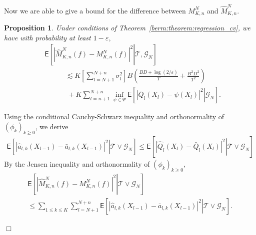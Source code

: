 \documentclass[bj]{imsart}
\def\NtrainPath{T}
\def\TrainSet{\mathcal{T}}
\newcommand{\proofendsign}{$\Box$}
\newtheorem{prop}[thm]{Proposition}
\newenvironment{proof}{{\noindent \bf Proof }}
 {{\hspace*{\fill}\proofendsign\par\bigskip}}
\begin{document}
Now we are able to give  a bound for the difference between \( M_{K,n}^N\) and \(\widehat M_{K,n}^N.\)
\begin{prop}
\label{cor:dif_m}
Under  conditions of Theorem~\ref{berm:theorem:regression_cv}, we have with probability at least \(1-\varepsilon,\)
\begin{align}
\label{eq:main_bound}
&\mathsf{E}\left[\left.\left|\widehat{M}_{K,n}^{N}(f)-M_{K,n}^{N}(f)\right|^{2}\right | \TrainSet,\mathcal{G}_N\right] \\
\nonumber
&\phantom{\mathsf{E}\widehat{M}_{K,n}^{N}}  \lesssim K\left[\sum_{l=N+1}^{N+n} \sigma^2_l \right]
B
\left(\frac{BD+\log(2/\varepsilon)}{\NtrainPath}+\frac{B^2D^2}{\NtrainPath^2}\right)
\\ \nonumber
& \phantom{\mathsf{E}|\widehat{M}_{K,n}^{N}} + K \sum_{l=n+1}^{N+n}\inf_{\psi\in \Psi}
\mathsf{E}\left[\left.\left|\bar Q_l(X_{l})-\psi(X_{l})\right|^{2}\right | \mathcal{G}_N \right].
\end{align}
\end{prop}
\begin{proof}
Using the conditional Cauchy-Schwarz inequality and  orthonormality of \((\phi_k)_{k\geq 0}\), we derive
\begin{eqnarray*}
\mathsf{E}\left[\left.\left|\widehat{a}_{l,k}(X_{l-1})-\bar a_{l,k}(X_{l-1})\right|^{2}\right | \TrainSet \vee \mathcal{G}_N\right]\leq\mathsf{E}\left[\left.\left|\widehat{Q}_{l}\left(X_{l}\right)-\bar Q_{l}\left(X_{l}\right)\right|^{2}\right | \TrainSet \vee \mathcal{G}_N\right]
\end{eqnarray*}
By the Jensen inequality and orthonormality of \((\phi_k)_{k\geq 0},\)
\begin{multline*}
\mathsf{E}\left[\left.\left|\widehat{M}_{K,n}^{N}(f)-M_{K,n}^{N}(f)\right|^{2}\right | \TrainSet \vee \mathcal{G}_N\right]
\\
\leq \sum_{1\leq k\le K}\sum_{l=N+1}^{N+n}\mathsf{E}\left[\left.\left|\widehat{a}_{l,k}(X_{l-1})-\bar a_{l,k}(X_{l-1})\right|^{2}\right | \TrainSet \vee \mathcal{G}_N\right].
\end{multline*}
\end{proof}
\end{document}
